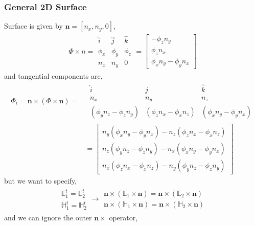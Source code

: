\documentclass{article}
\newcommand{\n}{\mathbf{n}}
\newcommand{\0}{\varnothing}
\newcommand{\Ev}{\mathbb{E}}
\newcommand{\Hv}{\mathbb{H}}
\begin{document}
\subsubsection*{General 2D Surface}
Surface is given by $\n = [n_x,n_y,0]$,
\begin{align*}
    \Phi \times n = 
    \begin{array}{|ccc|}
    \hat i & \hat j & \hat k\\
    \phi_x & \phi_y & \phi_z \\
        n_x & n_y & 0     
    \end{array}
    = 
    \left[
    \begin{array}{c}
    	- \phi_z n_y\\
	    \phi_z n_x \\
	    \phi_x n_y - \phi_y n_x
	\end{array}
	\right]
\end{align*}
 and tangential components are,
\begin{align*}
    \Phi_t = \n \times (\Phi \times \n) = &\;\begin{array}{|ccc|}
    \hat i & \hat j & \hat k\\
    n_x & n_y & n_z     \\
    (\phi_y n_z - \phi_z n_y) & (\phi_z n_x - \phi_x n_z) & (\phi_x n_y - \phi_y n_x)
    \end{array}\\
    &= \left[
    \begin{array}{c}
     n_y (\phi_x n_y - \phi_y n_x) - n_z (\phi_z n_x - \phi_x n_z) \\
       n_z (\phi_y n_z - \phi_z n_y) - n_x (\phi_x n_y - \phi_y n_x)\\
       n_x (\phi_z n_x - \phi_x n_z) - n_y (\phi_y n_z - \phi_z n_y)
       \end{array} \right]
\end{align*}
but we want to specify,
\begin{align*}
    \begin{array}{c}
    \Ev^t_{1} = \Ev^t_{2} \\
    \Hv^t_{1} = \Hv^t_{2} 
    \end{array}  \rightarrow
    \begin{array}{c}
    \n \times (\Ev_1 \times \n) = \n \times (\Ev_2 \times \n)\\ 
    \n \times (\Hv_1 \times \n) = \n \times (\Hv_2 \times \n)
    \end{array} 
\end{align*}
and we can ignore the outer $\n \times$ operator,
\end{document}
